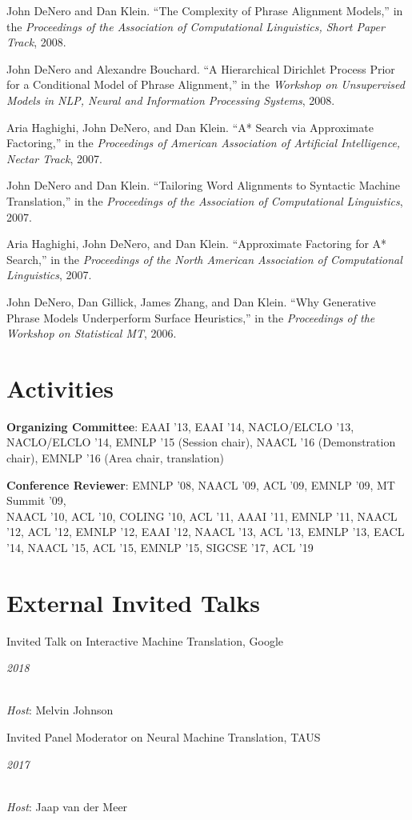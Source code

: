 \documentclass[margin,line]{res}
\newcommand{\dated}[2]{\parbox[t]{4.4in}{#1} \hspace{0.4in}
											 \parbox[t]{1in}{ {\it #2 } } }
\begin{document}
\begin{resume}
John DeNero and Dan Klein. ``The Complexity of Phrase Alignment Models,'' in the {\it Proceedings of the Association of Computational Linguistics, Short Paper Track}, 2008.

John DeNero and Alexandre Bouchard. ``A Hierarchical Dirichlet Process Prior for a Conditional Model of Phrase Alignment,'' in the {\it Workshop on Unsupervised Models in NLP, Neural and Information Processing Systems}, 2008.

Aria Haghighi, John DeNero, and Dan Klein. ``A* Search via Approximate Factoring,'' in the {\it Proceedings of American Association of Artificial Intelligence, Nectar Track}, 2007.

John DeNero and Dan Klein. ``Tailoring Word Alignments to Syntactic Machine Translation,'' in the {\it Proceedings of the Association of Computational Linguistics}, 2007.

Aria Haghighi, John DeNero, and Dan Klein. ``Approximate Factoring for A* Search,'' in the {\it Proceedings of the North American Association of Computational Linguistics}, 2007.

John DeNero, Dan Gillick, James Zhang, and Dan Klein. ``Why Generative Phrase Models Underperform Surface Heuristics,'' in the {\it Proceedings of the Workshop on Statistical MT}, 2006.

\section{\sc Activities}

{\bf Organizing Committee}: EAAI '13, EAAI '14, NACLO/ELCLO '13, NACLO/ELCLO
'14, EMNLP '15 (Session chair), NAACL '16 (Demonstration chair), EMNLP '16 (Area
chair, translation)

{\bf Conference Reviewer}: EMNLP '08, NAACL '09, ACL '09, EMNLP '09, MT Summit
'09,\\ NAACL '10, ACL '10, COLING '10, ACL '11, AAAI '11, EMNLP '11, NAACL '12,
ACL '12, EMNLP '12, EAAI '12, NAACL '13, ACL '13, EMNLP '13, EACL '14,
NAACL '15, ACL '15, EMNLP '15, SIGCSE '17, ACL '19

\section{\sc External Invited Talks }

\dated{Invited Talk on Interactive Machine Translation, Google} {2018} \\
{\em Host}: Melvin Johnson

\dated{Invited Panel Moderator on Neural Machine Translation, TAUS}{2017} \\
{\em Host}: Jaap van der Meer


\end{resume}
\end{document}
